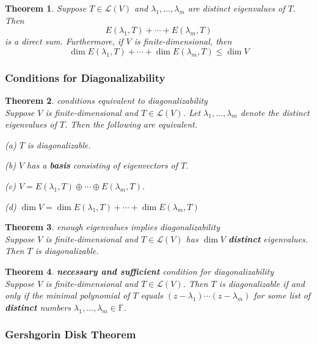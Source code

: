 \documentclass{article}
\newtheorem{theorem}{Theorem}[subsection]
\newcommand{\FF}{\mathbb{F}}
\begin{document}
\begin{CJK}{UTF8}{gkai}
\begin{theorem}
    Suppose $T \in \mathcal{L}(V)$ and $\lambda_1,\ldots, \lambda_m$ are distinct eigenvalues of $T$. Then \[E (\lambda_1,T) + \cdots+E (\lambda_m,T)\] is a direct sum. Furthermore, if $V$ is finite-dimensional, then
    \[\dim E (\lambda_1,T) + \cdots+\dim E (\lambda_m,T) \leq \dim V\]
\end{theorem}

\subsubsection{Conditions for Diagonalizability}

\begin{theorem}
    conditions equivalent to diagonalizability\\

    Suppose $V$ is finite-dimensional and $T \in \mathcal{L}(V)$. Let $\lambda_1,\ldots, \lambda_m$ denote the distinct eigenvalues of $T$. Then the following are equivalent.

    (a) $T$ is diagonalizable.

    (b) $V$ has a \textbf{basis} consisting of eigenvectors of $T$.

    (c) $V = E (\lambda_1,T)\oplus\cdots\oplus E (\lambda_m,T)$.

    (d) $\dim V = \dim E (\lambda_1,T)+ \cdots + \dim E (\lambda_m,T)$
\end{theorem}

\begin{theorem}
    enough eigenvalues implies diagonalizability\\
    
    Suppose $V$ is finite-dimensional and $T\in\mathcal{L}(V)$ has $\dim V$ \textbf{distinct} eigenvalues. Then $T$ is diagonalizable.
\end{theorem}

\begin{theorem}
    \textbf{necessary and sufficient} condition for diagonalizability\\

    Suppose $V$ is finite-dimensional and $T \in \mathcal{L}(V)$. Then $T$ is diagonalizable if and only if the minimal polynomial of $T$ equals $(z - \lambda_1)\cdots(z - \lambda_m)$ for some list of \textbf{distinct} numbers $\lambda_1,\ldots, \lambda_m \in \FF$.
\end{theorem}

\subsubsection{Gershgorin Disk Theorem}


\end{CJK}
\end{document}
